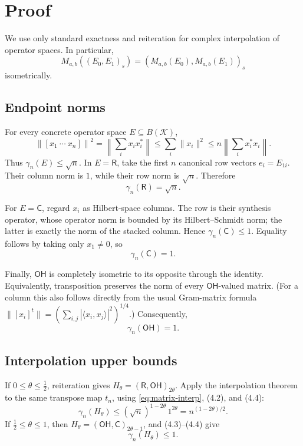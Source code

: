 \documentclass[11pt]{article}
\theoremstyle{definition}
\newcommand{\Rspace}{\mathsf R}
\newcommand{\Cspace}{\mathsf C}
\newcommand{\OH}{\mathsf{OH}}
\begin{document}
\section{Proof}

We use only standard exactness and reiteration for complex interpolation of
operator spaces.  In particular,
\[
 M_{a,b}((E_0,E_1)_s)
   =(M_{a,b}(E_0),M_{a,b}(E_1))_s
\tag{4.1}\label{eq:matrix-interp}
\]
isometrically.

\subsection*{Endpoint norms}

For every concrete operator space \(E\subseteq B(\mathcal K)\),
\[
 \left\|[x_1\ \cdots\ x_n]\right\|^2
 =\left\|\sum_i x_ix_i^*\right\|
 \leq \sum_i\|x_i\|^2
 \leq n\left\|\sum_i x_i^*x_i\right\|.
\]
Thus \(\gamma_n(E)\leq\sqrt n\).  In \(E=\Rspace\), take the first \(n\)
canonical row vectors \(e_i=E_{1i}\).  Their column norm is \(1\), while their
row norm is \(\sqrt n\).  Therefore
\[
 \gamma_n(\Rspace)=\sqrt n.\tag{4.2}
\]

For \(E=\Cspace\), regard \(x_i\) as Hilbert-space columns.  The row is their
synthesis operator, whose operator norm is bounded by its Hilbert--Schmidt
norm; the latter is exactly the norm of the stacked column.  Hence
\(\gamma_n(\Cspace)\leq1\).  Equality follows by taking only \(x_1\neq0\), so
\[
 \gamma_n(\Cspace)=1.\tag{4.3}
\]

Finally, \(\OH\) is completely isometric to its opposite through the identity.
Equivalently, transposition preserves the norm of every \(\OH\)-valued
matrix.  (For a column this also follows directly from the usual Gram-matrix
formula
\(
 \|[x_i]^t\|=(\sum_{i,j}|\langle x_i,x_j\rangle|^2)^{1/4}.
\))  Consequently,
\[
 \gamma_n(\OH)=1.\tag{4.4}
\]

\subsection*{Interpolation upper bounds}

If \(0\leq\theta\leq\tfrac12\), reiteration gives
\(H_\theta=(\Rspace,\OH)_{2\theta}\).  Apply the interpolation theorem to the
same transpose map \(t_n\), using \eqref{eq:matrix-interp}, (4.2), and (4.4):
\[
 \gamma_n(H_\theta)
 \leq (\sqrt n)^{1-2\theta}\,1^{2\theta}
 =n^{(1-2\theta)/2}.\tag{4.5}
\]
If \(\tfrac12\leq\theta\leq1\), then
\(H_\theta=(\OH,\Cspace)_{2\theta-1}\), and (4.3)--(4.4) give
\[
 \gamma_n(H_\theta)\leq1.\tag{4.6}
\]
\end{document}
